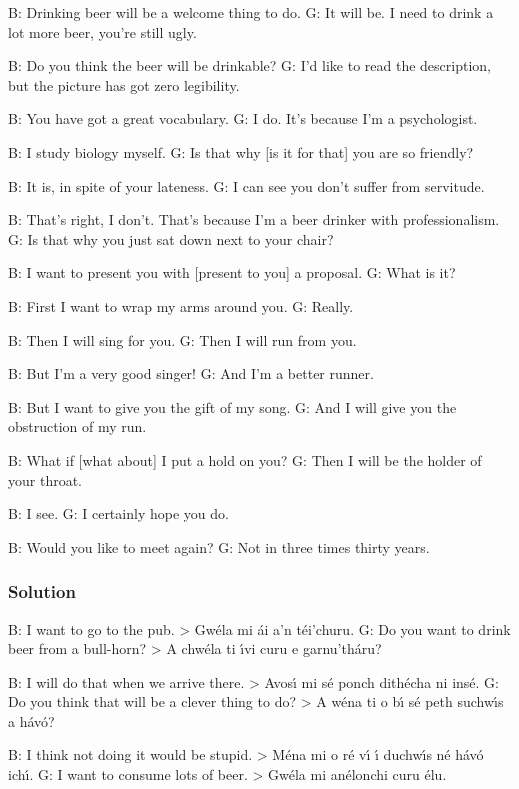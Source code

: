 B: Drinking beer will be a welcome thing to do.
G: It will be. I need to drink a lot more beer, you're still ugly.

B: Do you think the beer will be drinkable?
G: I'd like to read the description, but the picture has got zero legibility.

B: You have got a great vocabulary.
G: I do. It's because I'm a psychologist.

B: I study biology myself.
G: Is that why [is it for that] you are so friendly?

B: It is, in spite of your lateness.
G: I can see you don't suffer from servitude.

B: That's right, I don't. That's because I'm a beer drinker with professionalism.
G: Is that why you just sat down next to your chair?

B: I want to present you with [present to you] a proposal.
G: What is it?

B: First I want to wrap my arms around you.
G: Really.

B: Then I will sing for you.
G: Then I will run from you.

B: But I'm a very good singer!
G: And I'm a better runner.

B: But I want to give you the gift of my song.
G: And I will give you the obstruction of my run.

B: What if [what about] I put a hold on you?
G: Then I will be the holder of your throat.

B: I see.
G: I certainly hope you do.

B: Would you like to meet again?
G: Not in three times thirty years.

\newpage
\subsubsection{Solution}

B: I want to go to the pub. > Gw\'{e}la mi \'{a}i a'n t\'{e}i'churu.
G: Do you want to drink beer from a bull-horn? > A chw\'{e}la ti \'{\i}vi curu e garnu'th\'{a}ru?

B: I will do that when we arrive there. > Avos\'{\i} mi s\'{e} ponch dith\'{e}cha ni ins\'{e}.
G: Do you think that will be a clever thing to do? > A w\'{e}na ti o b\'{\i} s\'{e} peth suchw\'{\i}s a h\'{a}v\'{o}?

B: I think not doing it would be stupid. > M\'{e}na mi o r\'{e} v\'{\i} \'{\i} duchw\'{\i}s n\'{e} h\'{a}v\'{o} ich\'{\i}.
G: I want to consume lots of beer. > Gw\'{e}la mi an\'{e}lonchi curu \'{e}lu.

